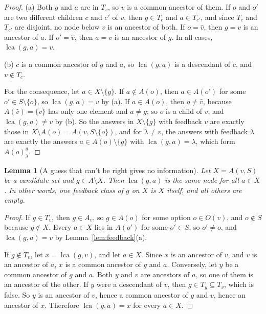 \documentclass[11pt]{article}
\newtheorem{lemma}[theorem]{Lemma}
\newcommand{\lca}{\operatorname{lca}}
\begin{document}
\begin{proof}
  (a) Both $g$ and $a$ are in $T_v$, so $v$ is a common ancestor of them. If $o$
  and $o'$ are two different children $c$ and $c'$ of $v$, then $g \in T_c$ and
  $a \in T_{c'}$, and since $T_c$ and $T_{c'}$ are disjoint, no node below $v$ is
  an ancestor of both. If $o = \hat v$, then $g = v$ is an ancestor of $a$. If
  $o' = \hat v$, then $a = v$ is an ancestor of $g$. In all cases,
  $\lca(g, a) = v$.

  (b) $c$ is a common ancestor of $g$ and $a$, so $\lca(g, a)$ is a descendant of
  $c$, and $v \notin T_c$.

  For the consequence, let $a \in X \setminus \{g\}$. If $a \notin A(o)$, then
  $a \in A(o')$ for some $o' \in S \setminus \{o\}$, so $\lca(g, a) = v$ by (a).
  If $a \in A(o)$, then $o \ne \hat v$, because $A(\hat v) = \{v\}$ has only one
  element and $a \ne g$; so $o$ is a child of $v$, and $\lca(g, a) \ne v$ by (b).
  So the answers in $X \setminus \{g\}$ with feedback $v$ are exactly those in
  $X \setminus A(o) = A(v, S \setminus \{o\})$, and for $\lambda \ne v$, the
  answers with feedback $\lambda$ are exactly the answers
  $a \in A(o) \setminus \{g\}$ with $\lca(g, a) = \lambda$, which form
  $A(o)^g_\lambda$.
\end{proof}

\begin{lemma}[A guess that can't be right gives no information]
  \label{lem:useless}
  Let $X = A(v, S)$ be a candidate set and $g \in A \setminus X$. Then
  $\lca(g, a)$ is the same node for all $a \in X$. In other words, one feedback
  class of $g$ on $X$ is $X$ itself, and all others are empty.
\end{lemma}

\begin{proof}
  If $g \in T_v$, then $g \in A_v$, so $g \in A(o)$ for some option
  $o \in O(v)$, and $o \notin S$ because $g \notin X$. Every $a \in X$ lies in
  $A(o')$ for some $o' \in S$, so $o' \ne o$, and $\lca(g, a) = v$ by
  Lemma~\ref{lem:feedback}(a).

  If $g \notin T_v$, let $x = \lca(g, v)$, and let $a \in X$. Since $x$ is an
  ancestor of $v$, and $v$ is an ancestor of $a$, $x$ is a common ancestor of $g$
  and $a$. Conversely, let $y$ be a common ancestor of $g$ and $a$. Both $y$ and
  $v$ are ancestors of $a$, so one of them is an ancestor of the other. If $y$
  were a descendant of $v$, then $g \in T_y \subseteq T_v$, which is false. So
  $y$ is an ancestor of $v$, hence a common ancestor of $g$ and $v$, hence an
  ancestor of $x$. Therefore $\lca(g, a) = x$ for every $a \in X$.
\end{proof}
\end{document}
